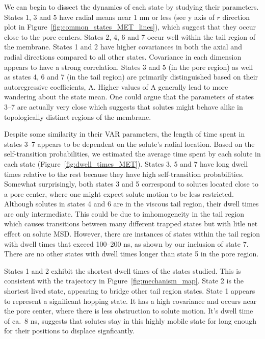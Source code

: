 \documentclass{article}
\begin{document}
  We can begin to dissect the dynamics of each state by studying their parameters.
  States 1, 3 and 5 have radial means near 1 nm or less (see y axis of $r$ direction 
  plot in Figure~\ref{fig:common_states_MET_lines}), which suggest that they occur
  close to the pore centers. States 2, 4, 6 and 7 occur well within the tail region
  of the membrane. States 1 and 2 have higher covariances in both the axial and radial
  directions compared to all other states. Covariance in each dimension appears to have
  a strong correlation. States 3 and 5 (in the pore region) as well as states 4, 6 and
  7 (in the tail region) are primarily distinguished based on their autoregressive 
  coefficients, A. Higher values of A generally lead to more wandering about the state
  mean. One could argue that the parameters of states 3--7 are actually very close which
  suggests that solutes might behave alike in topologically distinct regions of the 
  membrane.

  Despite some similarity in their VAR parameters, the length of time spent in states 
  3--7 appears to be dependent on the solute's radial location. Based on the 
  self-transition probabilities, we estimated the average time spent by each solute in
  each state (Figure~\ref{fig:dwell_times_MET}). States 3, 5 and 7 have long dwell times
  relative to the rest because they have high self-transition probabilities. Somewhat 
  surprisingly, both states 3 and 5 correspond to solutes located close to a pore center,
  where one might expect solute motion to be less restricted. Although solutes in states
  4 and 6 are in the viscous tail region, their dwell times are only intermediate. This
  could be due to imhomogeneity in the tail region which causes transitions between many
  different trapped states but with litle net effect on solute MSD. However, there are
  instances of states within the tail region with dwell times that exceed 100--200 ns,
  as shown by our inclusion of state 7. There are no other states with dwell times longer
  than state 5 in the pore region.
  
  States 1 and 2 exhibit the shortest dwell times of the states studied. This is 
  consistent with the trajectory in Figure~\ref{fig:mechanism_map}. State 2 is the 
  shortest lived state, appearing to bridge other tail region states. State 1 
  appears to represent a significant hopping state. It has a high covariance and
  occurs near the pore center, where there is less obstruction to solute motion.
  It's dwell time of ca.~8 ns, suggests that solutes stay in this highly mobile 
  state for long enough for their positions to displace signficantly.
  
\end{document}
